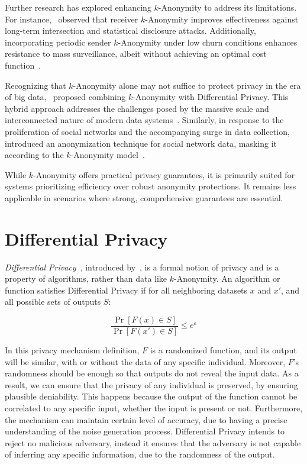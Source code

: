 Further research has explored enhancing \(k\)-Anonymity to address its limitations. For instance,~\citeauthor{kAnonymityEffectiveness} observed that receiver \(k\)-Anonymity improves effectiveness against long-term intersection and statistical disclosure attacks. Additionally, incorporating periodic sender \(k\)-Anonymity under low churn conditions enhances resistance to mass surveillance, albeit without achieving an optimal cost function~\cite{kAnonymityEffectiveness}.

Recognizing that \(k\)-Anonymity alone may not suffice to protect privacy in the era of big data,~\citeauthor{BigdataKAnon} proposed combining \(k\)-Anonymity with Differential Privacy. This hybrid approach addresses the challenges posed by the massive scale and interconnected nature of modern data systems~\cite{BigdataKAnon}. Similarly, in response to the proliferation of social networks and the accompanying surge in data collection,~\citeauthor{CAMPAN} introduced an anonymization technique for social network data, masking it according to the \(k\)-Anonymity model~\cite{CAMPAN}.

While \(k\)-Anonymity offers practical privacy guarantees, it is primarily suited for systems prioritizing efficiency over robust anonymity protections. It remains less applicable in scenarios where strong, comprehensive guarantees are essential.


\section{Differential Privacy}\label{sec:differential_privacy}

\textit{Differential Privacy}~\cite*{DifPrivacy, DifPrivacyCalNoise, DP_Book}, introduced by~\citeauthor{DifPrivacyCalNoise}, is a formal notion of privacy and is a property of algorithms, rather than data like \(k\)-Anonymity. An algorithm or function satisfies Differential Privacy if for all neighboring datasets \(x\) and \(x'\), and all possible sets of outputs \(S\):

\begin{equation}\label{eq:dp_privacy_mechanism}
    \frac{\Pr[F(x) \in S]}{\Pr[F(x') \in S]} \leq e^{\varepsilon}
\end{equation}

In this privacy mechanism definition, \(F\) is a randomized function, and its output will be similar, with or without the data of any specific individual. Moreover, \(F\)'s randomness should be enough so that outputs do not reveal the input data. As a result, we can ensure that the privacy of any individual is preserved, by ensuring plausible deniability. This happens because the output of the function cannot be correlated to any specific input, whether the input is present or not. Furthermore, the mechanism can maintain certain level of accuracy, due to having a precise understanding of the noise generation process. Differential Privacy intends to reject no malicious adversary, instead it ensures that the adversary is not capable of inferring any specific information, due to the randomness of the output.

